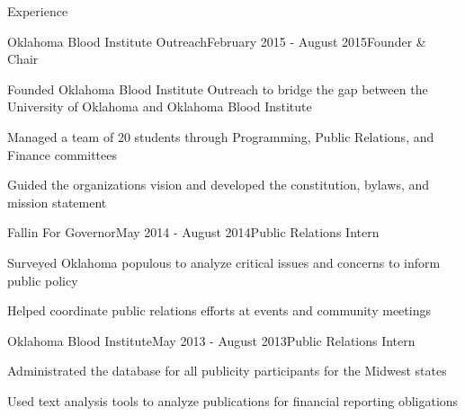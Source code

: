 \documentclass{resume} %
\begin{document}
\begin{rSection}{Experience}

\begin{rSubsection}{Oklahoma Blood Institute Outreach}{February 2015 - August 2015}{Founder \& Chair}{}
\item Founded Oklahoma Blood Institute Outreach to bridge the gap between the University of Oklahoma and Oklahoma Blood Institute 
\item Managed a team of 20 students through Programming, Public Relations, and Finance committees
\item Guided the organizations vision and developed the constitution, bylaws, and mission statement  
\end{rSubsection}

\begin{rSubsection}{Fallin For Governor}{May 2014 - August 2014}{Public Relations Intern}{}
\item Surveyed Oklahoma populous to analyze critical issues and concerns to inform public policy
\item Helped coordinate public relations efforts at events and community meetings
\end{rSubsection}
\begin{rSubsection}{Oklahoma Blood Institute}{May 2013 - August 2013}{Public Relations Intern}{}
\item Administrated the database for all publicity participants for the Midwest states 
\item Used text analysis tools to analyze publications for financial reporting obligations 

\end{rSubsection}

\end{rSection}
\end{document}
